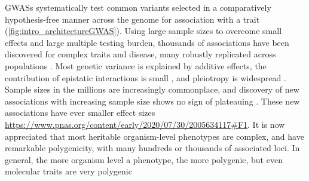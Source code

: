 \begin{outline}
\1 \Glspl{GWAS} systematically test common variants selected in a comparatively hypothesis-free manner across the genome for association with a trait (\autoref{fig:intro_architectureGWAS}).
Using large sample sizes to overcome small effects and large multiple testing burden, thousands of associations have been discovered for complex traits and disease,
many robustly replicated across populations \autocite{visscher2012FiveYearsGWAS,visscher201710YearsGWAS}.
Most genetic variance is explained by additive effects, the contribution of epistatic interactions is small \autocite{visscher2019Fisher1918Paper}, 
and pleiotropy is widespread \autocite{visscher2012FiveYearsGWAS}.
Sample sizes in the millions are increasingly commonplace, 
and discovery of new associations with increasing sample size shows no sign of plateauing \autocite{tam2019BenefitsLimitationsGenomewide}.
    \2 These new associations have ever smaller effect sizes \url{https://www.pnas.org/content/early/2020/07/30/2005634117#F1}.
It is now appreciated that most heritable organism-level phenotypes are complex, and have remarkable polygenicity, with many hundreds or thousands of associated loci.
    \2 In general, the more organism level a phenotype, the more polygenic, but even molecular traits are very polygenic


\end{outline}

